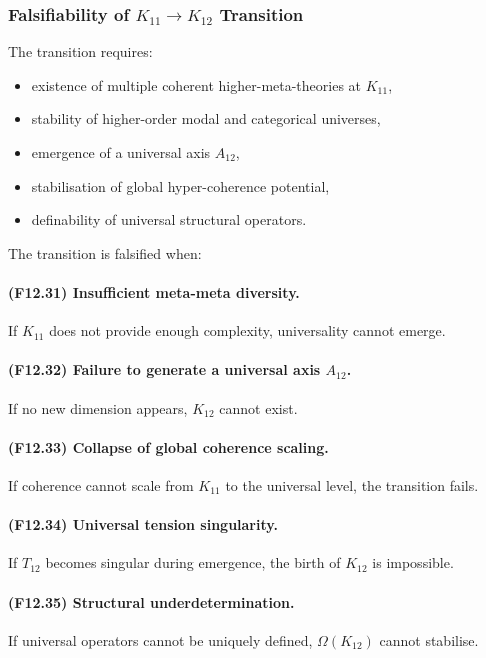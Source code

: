 \subsubsection{Falsifiability of $K_{11} \to K_{12}$ Transition}

The transition requires:

\begin{itemize}
    \item existence of multiple coherent higher-meta-theories at $K_{11}$,
    \item stability of higher-order modal and categorical universes,
    \item emergence of a universal axis $A_{12}$,
    \item stabilisation of global hyper-coherence potential,
    \item definability of universal structural operators.
\end{itemize}

The transition is falsified when:

\paragraph{(F12.31) Insufficient meta-meta diversity.}
If $K_{11}$ does not provide enough complexity, universality cannot emerge.

\paragraph{(F12.32) Failure to generate a universal axis $A_{12}$.}
If no new dimension appears, $K_{12}$ cannot exist.

\paragraph{(F12.33) Collapse of global coherence scaling.}
If coherence cannot scale from $K_{11}$ to the universal level,
the transition fails.

\paragraph{(F12.34) Universal tension singularity.}
If $T_{12}$ becomes singular during emergence,
the birth of $K_{12}$ is impossible.

\paragraph{(F12.35) Structural underdetermination.}
If universal operators cannot be uniquely defined,
$\Omega(K_{12})$ cannot stabilise.



